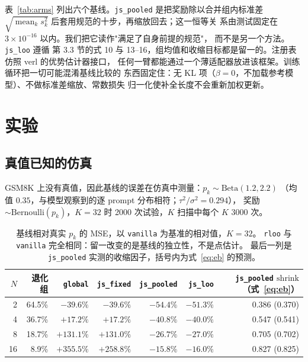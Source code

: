 \documentclass{article}
\newcommand{\shrink}{\mathrm{shrink}}
\newcommand{\arm}[1]{\texttt{#1}}
\begin{document}
表~\ref{tab:arms} 列出六个基线。\arm{js\_pooled} 是把奖励除以合并组内标准差
$\sqrt{\operatorname{mean}_k s_k^2}$ 后套用规范的十步，再缩放回去；这一恒等关
系由测试固定在 $3\times10^{-16}$ 以内。我们把它读作"满足了自身前提的规范"，
而不是另一个方法。\arm{js\_loo} 遵循 \citet{zeng2025shrinking} 第 3.3 节的式
10 与 13--16，组均值和收缩目标都是留一的。注册表仿照 verl 的优势估计器接口，
任何一臂都能通过一个薄适配器放进该框架。训练循环把一切可能混淆基线比较的
东西固定住：无 KL 项（$\beta=0$，不加载参考模型）、不做标准差缩放、常数损失
归一化使补全长度不会重新加权更新。

\section{实验}

\subsection{真值已知的仿真}
\label{sec:synthetic}

GSM8K 上没有真值，因此基线的误差在仿真中测量：$p_k\sim\mathrm{Beta}(1.2,2.2)$
（均值 $0.35$，与模型观察到的逐 prompt 分布相符；$\tau^2/\sigma^2=0.294$），
奖励 $\sim\mathrm{Bernoulli}(p_k)$，$K=32$ 时 2000 次试验，$K$ 扫描中每个 $K$
3000 次。

\begin{table}[t]\centering\small
\begin{tabular}{rrrrrrr}
\toprule
$N$ & 退化组 & \arm{global} & \arm{js\_fixed} & \arm{js\_pooled} & \arm{js\_loo} & \arm{js\_pooled} $\shrink$（式~\ref{eq:eb}） \\
\midrule
2  & 64.5\% & $-39.6\%$  & $-39.6\%$  & $-54.4\%$ & $-51.3\%$ & 0.386 (0.370) \\
4  & 36.7\% & $+17.2\%$  & $+17.2\%$  & $-40.8\%$ & $-40.0\%$ & 0.547 (0.541) \\
8  & 18.7\% & $+131.1\%$ & $+131.0\%$ & $-26.7\%$ & $-27.0\%$ & 0.705 (0.702) \\
16 & 8.9\%  & $+355.5\%$ & $+258.8\%$ & $-15.8\%$ & $-16.0\%$ & 0.827 (0.825) \\
\bottomrule
\end{tabular}
\caption{基线相对真实 $p_k$ 的 MSE，以 \arm{vanilla} 为基准的相对值，$K=32$。
\arm{rloo} 与 \arm{vanilla} 完全相同：留一改变的是基线的独立性，不是点估计。
最后一列是 \arm{js\_pooled} 实测的收缩因子，括号内为式~\eqref{eq:eb} 的预测。}
\label{tab:synth}
\end{table}
\end{document}

